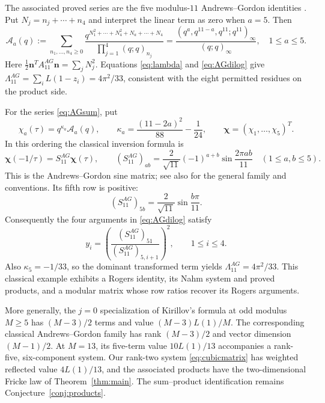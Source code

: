 \documentclass[11pt,reqno]{amsart}
\theoremstyle{remark}
\numberwithin{equation}{section}
\begin{document}
The associated proved series are the five modulus-$11$ Andrews--Gordon
identities \cite{Andrews}. Put $N_j=n_j+\cdots+n_4$ and interpret the
linear term as zero when $a=5$. Then
\begin{equation}\label{eq:AGsum}
 \mathcal A_a(q):=
 \sum_{n_1,\ldots,n_4\geq0}
 \frac{q^{N_1^2+\cdots+N_4^2+N_a+\cdots+N_4}}
 {\prod_{j=1}^4(q;q)_{n_j}}
 =\frac{(q^a,q^{11-a},q^{11};q^{11})_\infty}{(q;q)_\infty},
 \quad 1\leq a\leq5.
\end{equation}
Here $\tfrac12\mathbf n^TA_{11}^{AG}\mathbf n=\sum_jN_j^2$.
Equations \eqref{eq:lambda} and \eqref{eq:AGdilog} give
$\Lambda_{11}^{AG}=\sum_iL(1-z_i)=4\pi^2/33$, consistent with the eight
permitted residues on the product side.

For the series \eqref{eq:AGsum}, put
\[
 \chi_a(\tau)=q^{\kappa_a}\mathcal A_a(q),\qquad
 \kappa_a=\frac{(11-2a)^2}{88}-\frac1{24},\qquad
 \boldsymbol\chi=(\chi_1,\ldots,\chi_5)^T.
\]
In this ordering the classical inversion formula is
\begin{equation}\label{eq:AGtransform}
 \boldsymbol\chi(-1/\tau)=S_{11}^{AG}\boldsymbol\chi(\tau),\qquad
 (S_{11}^{AG})_{ab}=\frac2{\sqrt{11}}(-1)^{a+b}
 \sin\frac{2\pi ab}{11}\quad(1\leq a,b\leq5).
\end{equation}
This is the Andrews--Gordon sine matrix; see also
\cite[Section~4]{Ono} for the general family and conventions.
Its fifth row is positive:
\[
 (S_{11}^{AG})_{5b}=\frac2{\sqrt{11}}\sin\frac{b\pi}{11}.
\]
Consequently the four arguments in \eqref{eq:AGdilog} satisfy
\begin{equation}\label{eq:AGratios}
 y_i=\left(\frac{(S_{11}^{AG})_{51}}{(S_{11}^{AG})_{5,i+1}}\right)^2,
 \qquad 1\leq i\leq4.
\end{equation}
Also $\kappa_5=-1/33$, so the dominant transformed term yields
$\Lambda_{11}^{AG}=4\pi^2/33$. This classical example exhibits a Rogers
identity, its Nahm system and proved products, and a modular matrix whose
row ratios recover its Rogers arguments.

More generally, the $j=0$ specialization of Kirillov's formula at odd
modulus $M\geq5$ has $(M-3)/2$ terms and value $(M-3)L(1)/M$.
The corresponding classical Andrews--Gordon family has rank $(M-3)/2$
and vector dimension $(M-1)/2$. At $M=13$, its five-term value
$10L(1)/13$ accompanies a rank-five, six-component system. Our
rank-two system \eqref{eq:cubicmatrix} has weighted reflected value
$4L(1)/13$, and the associated products have the two-dimensional
Fricke law of Theorem~\ref{thm:main}. The sum--product identification
remains Conjecture~\ref{conj:products}.
\end{document}
